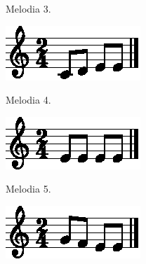 \begin{figure}[!h]
\begin{subfigure}[b]{0.3\textwidth}
         \caption{Melodia 3.}
         \label{fig:melodia-chars-shape-3-1}
     \end{subfigure}
     \hfill
     \begin{subfigure}[b]{0.3\textwidth}
         \centering
         \href{https://drive.google.com/file/d/1Yx5ivMcNrHLLv0CE6k1_WaWYHkeFtr0-/view?usp=sharing}{\includegraphics[width=\textwidth]{chapters/cap-musicalidade-percepcion/melodia-chars-shape-4-1.eps}}
         \caption{Melodia 4.}
         \label{fig:melodia-chars-shape-4-1}
     \end{subfigure}
     \hfill
     \begin{subfigure}[b]{0.3\textwidth}
         \centering
         \href{https://drive.google.com/file/d/1_61GHFPCOyzDegUuudMwcEmkjrvS0kAG/view?usp=sharing}{\includegraphics[width=\textwidth]{chapters/cap-musicalidade-percepcion/melodia-chars-shape-5-1.eps}}
         \caption{Melodia 5.}
         \label{fig:melodia-chars-shape-5-1}
     \end{subfigure}
     \hfill
     \begin{subfigure}[b]{0.3\textwidth}
         \centering
         \href{https://drive.google.com/file/d/1YRUrgJvnkGlmMI7UV1UwOmRJH3VBrzcq/view?usp=sharing}{\includegraphics[width=\textwidth]{chapters/cap-musicalidade-percepcion/melodia-chars-shape-6-1.eps}}

\end{subfigure}
\end{figure}
